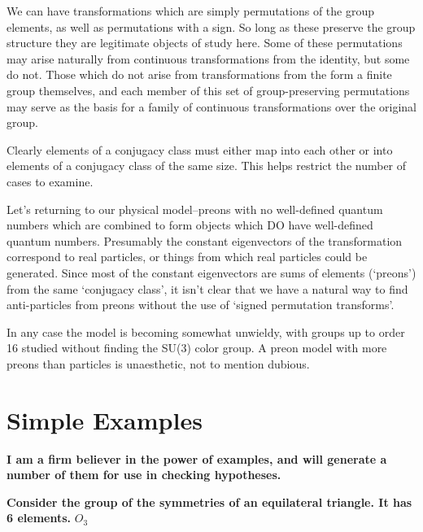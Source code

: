 \documentclass[12pt]{article}
\begin{document}
  We can have transformations which are simply permutations of the
group elements, as well as permutations with a sign.  So long as these
preserve the group structure they are legitimate objects of study here.
Some of these permutations may arise naturally from continuous transformations
from the identity, but some do not.  Those which do not arise from
transformations from the form
a finite group themselves, and each member of this set of
group-preserving permutations may serve as
the basis for a family of continuous transformations over the original
group.

 Clearly elements of a conjugacy class must either map
into each other or into elements of a conjugacy class of the same size.
This helps restrict the number of cases to examine.


 Let's returning to our physical
model--preons with no well-defined quantum numbers which are combined to
form objects which DO have well-defined quantum numbers.  Presumably
the constant eigenvectors of the transformation correspond to real particles, or
things from which real particles could be generated.  Since most of
the constant eigenvectors are sums of elements (`preons') from the
same `conjugacy class', it isn't clear 
that we have a natural way to find anti-particles
from preons without the use of `signed permutation transforms'.

 In any case the model is becoming somewhat
unwieldy, with groups up to order 16 studied without finding the
SU(3) color group.  A preon model with more preons than particles is
unaesthetic, not to mention dubious.


\section{ Simple Examples}

 {\bf I am a firm believer in the power of examples, and will generate
a number of them for use in checking hypotheses.}

 {\bf Consider the group of the symmetries of an equilateral triangle. 
It has 6 elements.}  $O_3$ 
\end{document}

